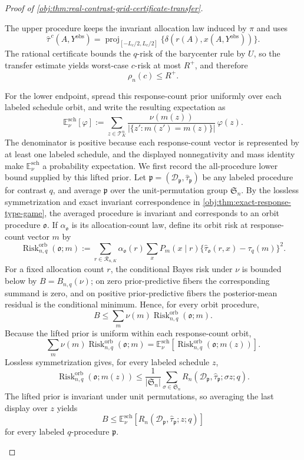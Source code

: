 \begin{proof}[Proof of \cref{obj:thm:real-contrast-grid-certificate-transfer}]
\begin{enumerate}
The upper procedure keeps the invariant allocation law induced by \(\pi\) and uses
\[
\widehat\tau^{\,c}(A,Y^{\mathrm{obs}})
=
\operatorname{proj}_{[-L_c/2,L_c/2]}
\{\delta(r(A),x(A,Y^{\mathrm{obs}}))\}.
\]
The rational certificate bounds the \(q\)-risk of the barycenter rule by \(U\), so the transfer estimate yields worst-case \(c\)-risk at most \(R^+\), and therefore
\[
\rho_n(c)\le R^+ .
\]

For the lower endpoint, spread this response-count prior uniformly over each labeled schedule orbit, and write the resulting expectation as
\[
\mathbb E^{\mathrm{sch}}_{\nu}[\varphi]
:=
\sum_{z\in\mathcal T_K^n}
\frac{\nu(m(z))}{|\{z':m(z')=m(z)\}|}\,\varphi(z).
\]
The denominator is positive because each response-count vector is represented by at least one labeled schedule, and the displayed nonnegativity and mass identity make \(\mathbb E^{\mathrm{sch}}_{\nu}\) a probability expectation.  We first record the all-procedure lower bound supplied by this lifted prior.  Let \(\mathfrak p=(\mathcal D_{\mathfrak p},\widehat\tau_{\mathfrak p})\) be any labeled procedure for contrast \(q\), and average \(\mathfrak p\) over the unit-permutation group \(\mathfrak S_n\).  By the lossless symmetrization and exact invariant correspondence in \cref{obj:thm:exact-response-type-game}, the averaged procedure is invariant and corresponds to an orbit procedure \(\mathfrak o\).  If \(\alpha_{\mathfrak o}\) is its allocation-count law, define its orbit risk at response-count vector \(m\) by
\[
\operatorname{Risk}^{\mathrm{orb}}_{n,q}(\mathfrak o;m)
:=
\sum_{r\in\mathcal R_{n,K}}\alpha_{\mathfrak o}(r)
\sum_x P_m(x\mid r)
\{\widehat\tau_{\mathfrak o}(r,x)-\tau_q(m)\}^2 .
\]
For a fixed allocation count \(r\), the conditional Bayes risk under \(\nu\) is bounded below by \(B=B_{n,q}(\nu)\); on zero prior-predictive fibers the corresponding summand is zero, and on positive prior-predictive fibers the posterior-mean residual is the conditional minimum.  Hence, for every orbit procedure,
\[
B
\le
\sum_{m}\nu(m)\operatorname{Risk}^{\mathrm{orb}}_{n,q}(\mathfrak o;m).
\]
Because the lifted prior is uniform within each response-count orbit,
\[
\sum_m\nu(m)\operatorname{Risk}^{\mathrm{orb}}_{n,q}(\mathfrak o;m)
=
\mathbb E^{\mathrm{sch}}_{\nu}
\left[\operatorname{Risk}^{\mathrm{orb}}_{n,q}(\mathfrak o;m(z))\right].
\]
Lossless symmetrization gives, for every labeled schedule \(z\),
\[
\operatorname{Risk}^{\mathrm{orb}}_{n,q}(\mathfrak o;m(z))
\le
\frac1{|\mathfrak S_n|}
\sum_{\sigma\in\mathfrak S_n}
R_n(\mathcal D_{\mathfrak p},\widehat\tau_{\mathfrak p};\sigma z;q).
\]
The lifted prior is invariant under unit permutations, so averaging the last display over \(z\) yields
\[
B
\le
\mathbb E^{\mathrm{sch}}_{\nu}
\left[R_n(\mathcal D_{\mathfrak p},\widehat\tau_{\mathfrak p};z;q)\right]
\]
for every labeled \(q\)-procedure \(\mathfrak p\).


\end{enumerate}
\end{proof}
